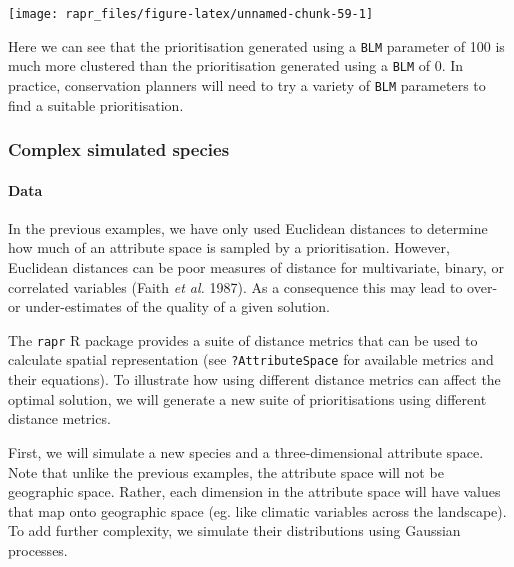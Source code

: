 \documentclass[11pt,]{article}
\let\origfigure\figure
\let\endorigfigure\endfigure
\renewenvironment{figure}[1][2] {
	\expandafter\origfigure\expandafter[H]
} {
	\endorigfigure
}
\begin{document}
\begin{figure}

{\centering \texttt{[image: rapr\_files/figure-latex/unnamed-chunk-59-1]} 

}

\caption{Difference between two multi-species prioritisations. See Figure 7 caption for conventions.}\label{fig:unnamed-chunk-59}
\end{figure}

Here we can see that the prioritisation generated using a \texttt{BLM}
parameter of 100 is much more clustered than the prioritisation
generated using a \texttt{BLM} of 0. In practice, conservation planners
will need to try a variety of \texttt{BLM} parameters to find a suitable
prioritisation.

\subsubsection{Complex simulated
species}\label{complex-simulated-species}

\paragraph{Data}\label{data-1}

In the previous examples, we have only used Euclidean distances to
determine how much of an attribute space is sampled by a prioritisation.
However, Euclidean distances can be poor measures of distance for
multivariate, binary, or correlated variables (Faith \emph{et al.}
1987). As a consequence this may lead to over- or under-estimates of the
quality of a given solution.

The \texttt{rapr} R package provides a suite of distance metrics that
can be used to calculate spatial representation (see
\texttt{?AttributeSpace} for available metrics and their equations). To
illustrate how using different distance metrics can affect the optimal
solution, we will generate a new suite of prioritisations using
different distance metrics.

First, we will simulate a new species and a three-dimensional attribute
space. Note that unlike the previous examples, the attribute space will
not be geographic space. Rather, each dimension in the attribute space
will have values that map onto geographic space (eg. like climatic
variables across the landscape). To add further complexity, we simulate
their distributions using Gaussian processes.
\end{document}
